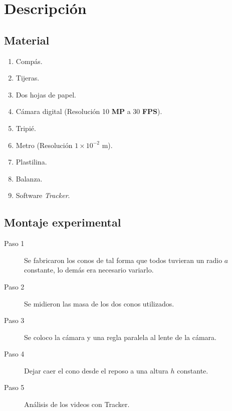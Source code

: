 \section{Descripción}

\subsection{Material}

\begin{enumerate}
    \item Compás.
    \item Tijeras.
    \item Dos hojas de papel.
    \item Cámara digital (Resolución 10 \textbf{MP} a 30 \textbf{FPS}).
    \item Tripié.
    \item Metro (Resolución $1\times10^{-2}$ m).
    \item Plastilina.
    \item Balanza.
    \item Software \textit{Tracker}.
\end{enumerate}

\subsection{Montaje experimental}

\begin{description}
    \item[Paso 1] Se fabricaron los conos de tal forma que todos
        tuvieran un radio $a$ constante, lo demás era necesario variarlo.
    \item[Paso 2] Se midieron las masa de los dos conos utilizados.
    \item[Paso 3] Se coloco la cámara y una regla paralela al lente de
        la cámara.
    \item[Paso 4] Dejar caer el cono desde el reposo a una altura $h$ constante.
    \item[Paso 5] Análisis de los videos con Tracker.
\end{description}
